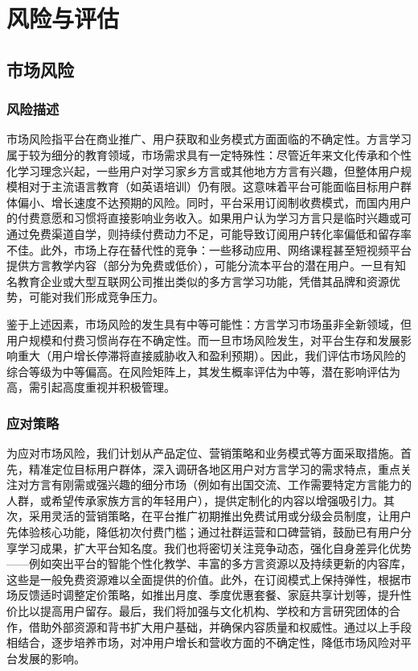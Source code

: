 \chapter{风险与评估}
\section{市场风险}
\subsection{风险描述}
市场风险指平台在商业推广、用户获取和业务模式方面面临的不确定性。方言学习属于较为细分的教育领域，市场需求具有一定特殊性：尽管近年来文化传承和个性化学习理念兴起，一些用户对学习家乡方言或其他地方方言有兴趣，但整体用户规模相对于主流语言教育（如英语培训）仍有限。这意味着平台可能面临目标用户群体偏小、增长速度不达预期的风险。同时，平台采用订阅制收费模式，而国内用户的付费意愿和习惯将直接影响业务收入。如果用户认为学习方言只是临时兴趣或可通过免费渠道自学，则持续付费动力不足，可能导致订阅用户转化率偏低和留存率不佳。此外，市场上存在替代性的竞争：一些移动应用、网络课程甚至短视频平台提供方言教学内容（部分为免费或低价），可能分流本平台的潜在用户。一旦有知名教育企业或大型互联网公司推出类似的多方言学习功能，凭借其品牌和资源优势，可能对我们形成竞争压力。

鉴于上述因素，市场风险的发生具有中等可能性：方言学习市场虽非全新领域，但用户规模和付费习惯尚存在不确定性。而一旦市场风险发生，对平台生存和发展影响重大（用户增长停滞将直接威胁收入和盈利预期）。因此，我们评估市场风险的综合等级为中等偏高。在风险矩阵上，其发生概率评估为中等，潜在影响评估为高，需引起高度重视并积极管理。
\subsection{应对策略}
为应对市场风险，我们计划从产品定位、营销策略和业务模式等方面采取措施。首先，精准定位目标用户群体，深入调研各地区用户对方言学习的需求特点，重点关注对方言有刚需或强兴趣的细分市场（例如有出国交流、工作需要特定方言能力的人群，或希望传承家族方言的年轻用户），提供定制化的内容以增强吸引力。其次，采用灵活的营销策略，在平台推广初期推出免费试用或分级会员制度，让用户先体验核心功能，降低初次付费门槛；通过社群运营和口碑营销，鼓励已有用户分享学习成果，扩大平台知名度。我们也将密切关注竞争动态，强化自身差异化优势——例如突出平台的智能个性化教学、丰富的多方言资源以及持续更新的内容库，这些是一般免费资源难以全面提供的价值。此外，在订阅模式上保持弹性，根据市场反馈适时调整定价策略，如推出月度、季度优惠套餐、家庭共享计划等，提升性价比以提高用户留存。最后，我们将加强与文化机构、学校和方言研究团体的合作，借助外部资源和背书扩大用户基础，并确保内容质量和权威性。通过以上手段相结合，逐步培养市场，对冲用户增长和营收方面的不确定性，降低市场风险对平台发展的影响。
